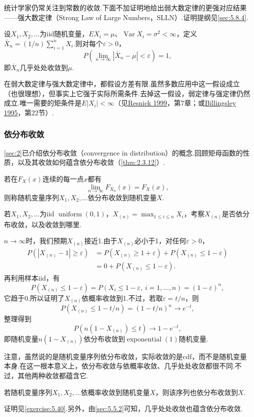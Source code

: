 统计学家仍常关注到常数的收敛.下面不加证明地给出弱大数定律的更强对应结果——强大数定律（Strong Law of Large Numbers，SLLN）.证明提纲见\autoref{sec:5.8.4}.
\begin{theorem}[强大数定律]\label{thm:5.5.9}
设$X_1,X_2,\ldots$为iid随机变量，$EX_i=\mu$、$\operatorname{Var}X_i=\sigma^2<\infty$，定义$\bar X_n=(1/n)\sum_{i=1}^nX_i$.则对每个$\varepsilon>0$，
$$P\left(\lim_{n\to\infty}|\bar X_n-\mu|<\varepsilon\right)=1,$$
即$\bar X_n$几乎处处收敛到$\mu$.
\end{theorem}
在弱大数定律与强大数定律中，都假设方差有限.虽然多数应用中这一假设成立（也很理想），但事实上它强于实际所需条件.去掉这一假设，弱定律与强定律仍然成立.唯一需要的矩条件是$E|X_i|<\infty$（见\hyperref[bib:source251]{Resnick 1999}，第7章；或\hyperref[bib:source33]{Billingsley 1995}，第22节\mbox{）.}
\subsubsection{依分布收敛}\label{sec:5.5.3}
\autoref{sec:2}已介绍依分布收敛（convergence in distribution）的概念.回顾矩母函数的性质，以及其收敛如何蕴含依分布收敛（\autoref{thm:2.3.12}）.
\begin{definition}\label{def:5.5.10}
若在$F_X(x)$连续的每一点$x$都有
$$\lim_{n\to\infty}F_{X_n}(x)=F_X(x),$$
则称随机变量序列$X_1,X_2,\ldots$依分布收敛到随机变量$X$.
\end{definition}
\begin{example}[均匀随机变量的最大值]\label{ex:5.5.11}
若$X_1,X_2,\ldots$为iid $\operatorname{uniform}(0,1)$，$X_{(n)}=\max_{1\le i\le n}X_i$，考察$X_{(n)}$是否依分布收敛，以及收敛到哪里.

$n\to\infty$时，我们预期$X_{(n)}$接近1.由于$X_{(n)}$必小于1，对任何$\varepsilon>0$，
\begin{align*}
P(|X_{(n)}-1|\ge\varepsilon)&=P(X_{(n)}\ge1+\varepsilon)+P(X_{(n)}\le1-\varepsilon)\\
&=0+P(X_{(n)}\le1-\varepsilon).
\end{align*}
再利用样本iid，有
$$P(X_{(n)}\le1-\varepsilon)=P(X_i\le1-\varepsilon,\ i=1,\ldots,n)=(1-\varepsilon)^n,$$
它趋于0.所以证明了$X_{(n)}$依概率收敛到1.不过，若取$\varepsilon=t/n$，则
$$P(X_{(n)}\le1-t/n)=(1-t/n)^n\to e^{-t},$$
整理得到
$$P(n(1-X_{(n)})\le t)\to1-e^{-t},$$
即随机变量$n(1-X_{(n)})$依分布收敛到$\operatorname{exponential}(1)$随机变量.
\end{example}
注意，虽然说的是随机变量序列依分布收敛，实际收敛的是cdf，而不是随机变量本身.在这一根本意义上，依分布收敛与依概率收敛、几乎处处收敛都很不同.不过，其他两种收敛都蕴含它.
\begin{theorem}\label{thm:5.5.12}
若随机变量序列$X_1,X_2,\ldots$依概率收敛到随机变量$X$，则该序列也依分布收敛到$X$.
\end{theorem}
证明见\autoref{exercise:5.40}.另外，由\autoref{sec:5.5.2}可知，几乎处处收敛也蕴含依分布收敛.

